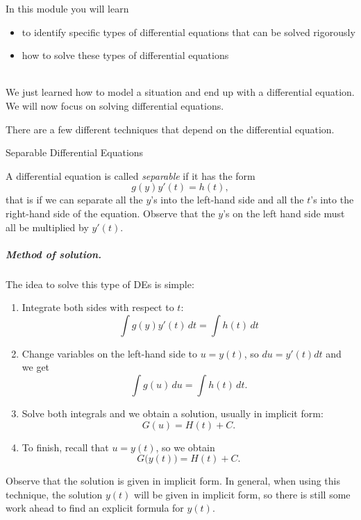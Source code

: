 In this module you will learn
\begin{itemize}
	\item to identify specific types of differential equations that can be solved rigorously
	\item how to solve these types of differential equations
\end{itemize}

\hfill \\

We just learned how to model a situation and end up with a differential equation.
We will now focus on solving differential equations. 

There are a few different techniques that depend on the differential equation. 

\hfill

\begin{submodule}{Separable Differential Equations}

\begin{definition}
A differential equation is called \emph{separable} if it has the form
$$
g(y) y'(t) = h(t),
$$
that is if we can separate all the $y$'s into the left-hand side and all the $t$'s into the right-hand side of the equation. Observe that the $y$'s on the left hand side must all be multiplied by $y'(t)$. 
\end{definition}


\subparagraph{\emph{Method of solution. }} The idea to solve this type of DEs is simple:
\begin{enumerate}[label={\bf \arabic*. } ]
\item Integrate both sides with respect to $t$:
$$
\int g(y) y'(t) \, dt = \int h(t) \, dt
$$

\item Change variables on the left-hand side to $u = y(t)$, so $du = y'(t) dt$ and we get
$$
\int g(u) \, du = \int h(t) \, dt.
$$

\item Solve both integrals and we obtain a solution, usually in implicit form:
$$
G(u) = H(t) + C.
$$

\item To finish, recall that $u=y(t)$, so we obtain
$$
G\big(y(t)\big) = H(t) + C.
$$
\end{enumerate}

\begin{important}
	Observe that the solution is given in implicit form. In general, when using this technique, the solution $y(t)$ will be given in implicit form, so there is still some work ahead to find an explicit formula for $y(t)$.	
\end{important}


\end{submodule}
